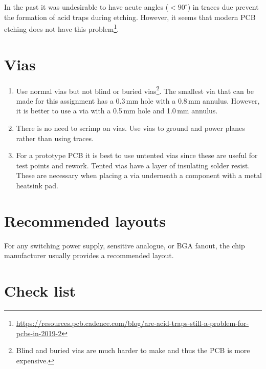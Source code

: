 In the past it was undesirable to have acute angles ($<90^{\circ}$) in
traces due prevent the formation of acid traps during etching.
However, it seems that modern PCB etching does not have this
problem\footnote{\url{https://resources.pcb.cadence.com/blog/are-acid-traps-still-a-problem-for-pcbs-in-2019-2}}.


\section{Vias}


\begin{enumerate}
\item Use normal vias but not blind or buried vias\footnote{Blind and
  buried vias are much harder to make and thus the PCB is more
  expensive.}.  The smallest via that can be made for this assignment
  has a 0.3\,mm hole with a 0.8\,mm annulus.  However, it is better to
  use a via with a 0.5\,mm hole and 1.0\,mm annulus.

\item There is no need to scrimp on vias.  Use vias to ground and
  power planes rather than using traces.

\item For a prototype PCB it is best to use untented vias since these
  are useful for test points and rework.  Tented vias have a layer of
  insulating solder resist.  These are necessary when placing a via
  underneath a component with a metal heatsink pad.
\end{enumerate}


\section{Recommended layouts}

For any switching power supply, sensitive analogue, or BGA fanout, the
chip manufacturer usually provides a recommended layout.

\section{Check list}
\label{PCB-check-list}

